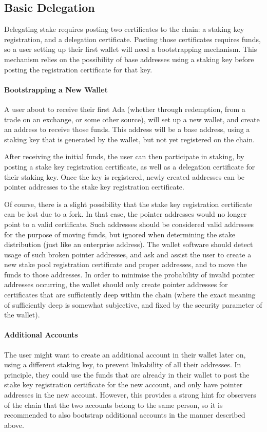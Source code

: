 \documentclass[11pt,a4paper]{article}
\begin{document}
\subsection{Basic Delegation}
\label{basic-delegation}

Delegating stake requires posting two certificates to the chain: a
staking key registration, and a delegation certificate. Posting those
certificates requires funds, so a user setting up their first wallet
will need a bootstrapping mechanism. This mechanism relies on the
possibility of base addresses using a staking key before posting the
registration certificate for that key.

\paragraph{Bootstrapping a New Wallet}
A user about to receive their first Ada (whether through redemption,
from a trade on an exchange, or some other source), will set up a new
wallet, and create an address to receive those funds. This address
will be a base address, using a staking key that is generated by the
wallet, but not yet registered on the chain.

After receiving the initial funds, the user can then participate in
staking, by posting a stake key registration certificate, as well as a
delegation certificate for their staking key. Once the key is
registered, newly created addresses can be pointer addresses to the
stake key registration certificate.

Of course, there is a slight possibility that the stake key
registration certificate can be lost due to a fork. In that case, the
pointer addresses would no longer point to a valid certificate. Such
addresses should be considered valid addresses for the purpose of
moving funds, but ignored when determining the stake distribution
(just like an enterprise address). The wallet software should detect
usage of such broken pointer addresses, and ask and assist the user to
create a new stake pool registration certificate and proper addresses,
and to move the funds to those addresses. In order to minimise the
probability of invalid pointer addresses occurring, the wallet should
only create pointer addresses for certificates that are sufficiently
deep within the chain (where the exact meaning of sufficiently deep is
somewhat subjective, and fixed by the security parameter of the
wallet).

\paragraph{Additional Accounts}
The user might want to create an additional account in their wallet
later on, using a different staking key, to prevent linkability of all
their addresses. In principle, they could use the funds that are
already in their wallet to post the stake key registration certificate
for the new account, and only have pointer addresses in the new
account. However, this provides a strong hint for observers of the
chain that the two accounts belong to the same person, so it is
recommended to also bootstrap additional accounts in the manner
described above.
\end{document}

